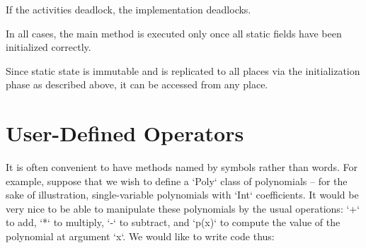 If the activities deadlock, the implementation deadlocks.

In all cases, the main method is executed only once all static fields
have been initialized correctly.

Since static state is immutable and is replicated to all places via 
the initialization phase as described above, it can be accessed from
any place.



\section{User-Defined Operators}
\label{sect:operators}

It is often convenient to have methods named by symbols rather than words.
For example, suppose that we wish to define a \xcd`Poly` class of
polynomials -- for the sake of illustration, single-variable polynomials with
\xcd`Int` coefficients.  It would be very nice to be able to manipulate these
polynomials by the usual operations: \xcd`+` to add, \xcd`*` to multiply,
\xcd`-` to subtract, and \xcd`p(x)` to compute the value of the polynomial at
argument \xcd`x`.  We would like to write code thus: 
%
%
%
%
%
%
%
%
